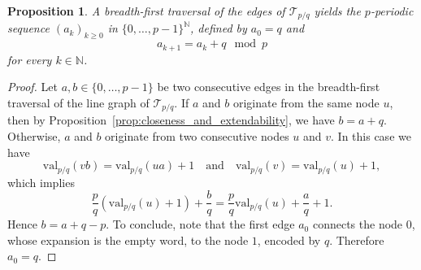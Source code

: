 \documentclass[10pt,a4paper]{amsart}
\newtheorem{proposition}{Proposition}
\newcommand{\N}{\mathbb N}
\newcommand{\tree}{\mathcal{T}} %
\newcommand{\val}{\mathrm{val}}
\begin{document}
\begin{proposition}\label{prop:rythm_signature} A breadth-first traversal \emph{of the edges} of $\tree_{p/q}$ yields the $p$-periodic sequence $(a_k)_{k\geq0}$ in $\{0,\ldots,p-1\}^{\N}$, defined by $a_0=q$ and \[a_{k+1}=a_k+q \mod p\] for every  $k \in \N$.
\end{proposition}

\begin{proof} Let $a, b \in \{0,\ldots,p-1\}$ be two consecutive edges in the breadth-first traversal of the line graph of $\tree_{p/q}$. If $a$ and $b$ originate from the same node $u$, then by Proposition~\ref{prop:closeness_and_extendability}, we have $b = a + q$.
	Otherwise, $a$ and $b$ originate from two consecutive nodes $u$ and $v$. In this case we have
	\[
	\val_{p/q}(vb) = \val_{p/q}(ua) + 1
	\quad \text{and} \quad
	\val_{p/q}(v) = \val_{p/q}(u) + 1,
	\]
	which implies
	\[
	\frac{p}{q}(\val_{p/q}(u)+1) + \frac{b}{q}
	=
	\frac{p}{q}\val_{p/q}(u) + \frac{a}{q} + 1.
	\]
	Hence $b = a + q - p$.
To conclude, note  that the first edge $a_0$ connects the node $0$, whose expansion is the empty word, to the node $1$, encoded by $q$. Therefore $a_0=q$.
\end{proof}
\end{document}
